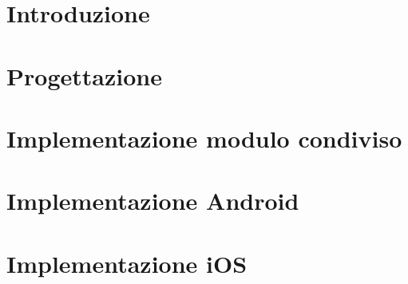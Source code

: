 

\section{Introduzione}

\section{Progettazione}

\section{Implementazione modulo condiviso}

\section{Implementazione Android}

\section{Implementazione iOS}
